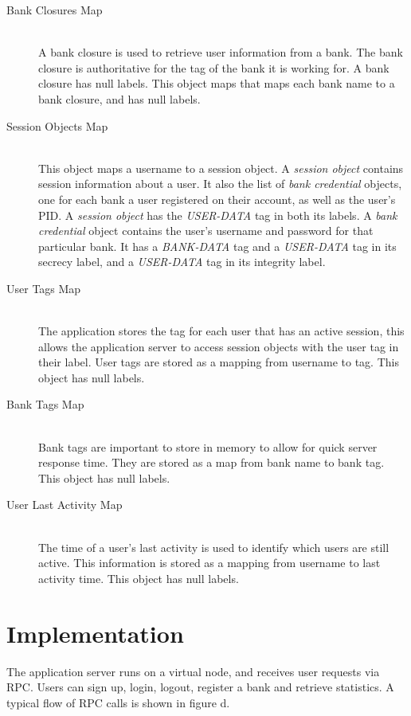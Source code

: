\begin{description}
  \item[Bank Closures Map] \ \\
    A bank closure is used to retrieve user
    information from a bank. The bank closure
    is authoritative for the tag of the bank
    it is working for. A bank closure has null
    labels.
    This object maps that maps each bank name 
    to a bank closure, and has null labels.
  \item[Session Objects Map] \ \\
    This object maps a username to a session 
    object.
    A \emph{session object} contains session 
    information about a user. It also
    the list of \emph{bank credential} objects,
    one for each bank a user registered on their
    account, as well as the user's PID. 
    A \emph{session object} has the 
    \emph{USER-DATA} tag in both its labels.
    A \emph{bank credential} object contains 
    the user's username and password for that
    particular bank. It has a \emph{BANK-DATA}
    tag and a \emph{USER-DATA} tag in its 
    secrecy label, and a \emph{USER-DATA} tag
    in its integrity label.
  \item[User Tags Map] \ \\
    The application stores the tag for each user 
    that has an active session, this allows the 
    application server to access session objects 
    with the user tag in their label. User tags 
    are stored as a mapping from username to tag.
    This object has null labels.
  \item[Bank Tags Map] \ \\
    Bank tags are important to store in memory to 
    allow for quick server response time. They are 
    stored as a map from bank name to bank tag.
    This object has null labels.
  \item[User Last Activity Map] \ \\
    The time of a user's last activity 
    is used to identify which users
    are still active. This information is stored 
    as a mapping from username to last activity 
    time.
    This object has null labels.
\end{description}

\section{Implementation}

The application server runs on a virtual node, and receives user requests via RPC. Users can sign up, login, logout, register a bank and retrieve statistics. A typical flow of RPC calls is shown in figure d. 

